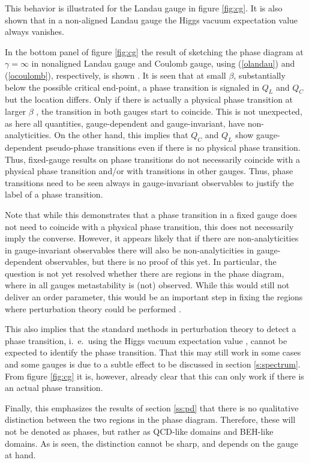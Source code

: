\documentclass[final,12pt,3p,longtitle]{elsarticle}
\newcommand*{\pref}[1]{(\ref{#1})}
\newcommand*{\1}{1\!\!\!\bot}
\begin{document}
This behavior is illustrated for the Landau gauge in figure \ref{fig:cg}. It is also shown that in a non-aligned Landau gauge the Higgs vacuum expectation value always vanishes.

In the bottom panel of figure \ref{fig:cg} the result of sketching the phase diagram at $\gamma=\infty$ in nonaligned Landau gauge and Coulomb gauge, using \pref{olandau} and \pref{ocoulomb}, respectively, is shown \cite{Caudy:2007sf}. It is seen that at small $\beta$, substantially below the possible critical end-point, a phase transition is signaled in $Q_L$ and $Q_C$ but the location differs. Only if there is actually a physical phase transition at larger $\beta$ \cite{Bonati:2009pf,Bonati:2009yi}, the transition in both gauges start to coincide. This is not unexpected, as here all quantities, gauge-dependent and gauge-invariant, have non-analyticities. On the other hand, this implies that $Q_C$ and $Q_L$ show gauge-dependent pseudo-phase transitions even if there is no physical phase transition. Thus, fixed-gauge results on phase transitions do not necessarily coincide with a physical phase transition and/or with transitions in other gauges. Thus, phase transitions need to be seen always in gauge-invariant observables to justify the label of a phase transition.

Note that while this demonstrates that a phase transition in a fixed gauge does not need to coincide with a physical phase transition, this does not necessarily imply the converse. However, it appears likely that if there are non-analyticities in gauge-invariant observables there will also be non-analyticities in gauge-dependent observables, but there is no proof of this yet. In particular, the question is not yet resolved whether there are regions in the phase diagram, where in all gauges metastability is (not) observed. While this would still not deliver an order parameter, this would be an important step in fixing the regions where perturbation theory could be performed \cite{Lee:1974zg}.

This also implies that the standard methods in perturbation theory to detect a phase transition, i.\ e.\ using the Higgs vacuum expectation value \cite{Kapusta:2006pm}, cannot be expected to identify the phase transition. That this may still work in some cases and some gauges is due to a subtle effect to be discussed in section \ref{s:spectrum}. From figure \ref{fig:cg} it is, however, already clear that this can only work if there is an actual phase transition.

Finally, this emphasizes the results of section \ref{ss:pd} that there is no qualitative distinction between the two regions in the phase diagram. Therefore, these will not be denoted as phases, but rather as QCD-like domains and BEH-like domains. As is seen, the distinction cannot be sharp, and depends on the gauge at hand.
\end{document}

